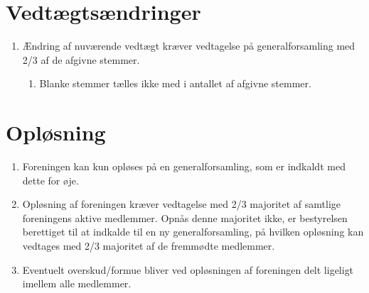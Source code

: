 \documentclass[a4paper, 10pt]{article}
\renewcommand\thesection{\textsection\arabic{section}}
\newenvironment{stykenum}{
  \begin{enumerate}[%
    label=Stk.~\arabic*:, ref=\thesection~Stk.~\arabic{enumi}, start=1]
}{\end{enumerate}}
\newenvironment{substykenum}{
  \begin{enumerate}[%
          label=Stk.~\arabic{enumi}.\arabic*:,
      ref=\thesection~Stk.~\arabic{enumi}.\arabic*, start=1]
}{\end{enumerate}}
\begin{document}
\section{Vedtægtsændringer}
\begin{stykenum}
    \item Ændring af nuværende vedtægt kræver vedtagelse på generalforsamling
        med 2/3 af de afgivne stemmer.
    \begin{substykenum}
        \item Blanke stemmer tælles ikke med i antallet af afgivne stemmer.
    \end{substykenum}
\end{stykenum}

\section{Opløsning}
\begin{stykenum}
    \item Foreningen kan kun opløses på en generalforsamling, som er indkaldt
        med dette for øje.

    \item Opløsning af foreningen kræver vedtagelse med 2/3 majoritet af
        samtlige foreningens aktive medlemmer. Opnås denne majoritet ikke, er
        bestyrelsen berettiget til at indkalde til en ny generalforsamling, på
        hvilken opløsning kan vedtages med 2/3 majoritet af de fremmødte
        medlemmer.

    \item Eventuelt overskud/formue bliver ved opløsningen af foreningen delt
        ligeligt imellem alle medlemmer.
\end{stykenum}
\end{document}
